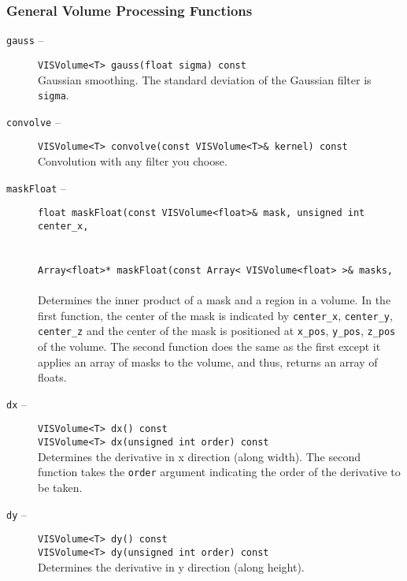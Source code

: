 \subsubsection{General Volume Processing Functions}
\label{vl_gvpf}
\begin{description}
\item[{\tt gauss} --]
{\tt VISVolume<T> gauss(float sigma) const}\\
Gaussian smoothing.  The standard deviation of the Gaussian filter
is {\tt sigma}.
\item[{\tt convolve} --]
{\tt VISVolume<T> convolve(const VISVolume<T>\& kernel) const}\\
Convolution with any filter you choose.
\item[{\tt maskFloat} --]
{\tt float maskFloat(const VISVolume<float>\& mask, unsigned int center\_x,} \\
\hspace*{0.25in}{\tt unsigned int center\_y, unsigned int center\_z, unsigned int x\_pos,}\\
\hspace*{0.25in}{\tt unsigned int y\_pos, unsigned int z\_pos) const}\\
{\tt Array<float>* maskFloat(const Array< VISVolume<float> >\& masks,}\\
\hspace*{0.25in}{\tt unsigned int x\_pos, unsigned int y\_pos const, unsigned int z\_pos) const}\\
Determines the inner product of a mask and a region in a volume.
In the first function, the center of the mask is indicated by
{\tt center\_x}, {\tt center\_y}, {\tt center\_z} and the center of the mask is
positioned at {\tt x\_pos}, {\tt y\_pos}, {\tt z\_pos} of the volume.
The second function does
the same as the first except it applies an array of masks
to the volume, and thus, returns an array of floats.
\item[{\tt dx} --]
{\tt VISVolume<T> dx() const}\\
{\tt VISVolume<T> dx(unsigned int order) const}\\
Determines the derivative in x direction (along width).
The second function takes the {\tt order} argument indicating
the order of the derivative to be taken.
\item[{\tt dy} --]
{\tt VISVolume<T> dy() const}\\
{\tt VISVolume<T> dy(unsigned int order) const}\\
Determines the derivative in y direction (along height).

\end{description}
